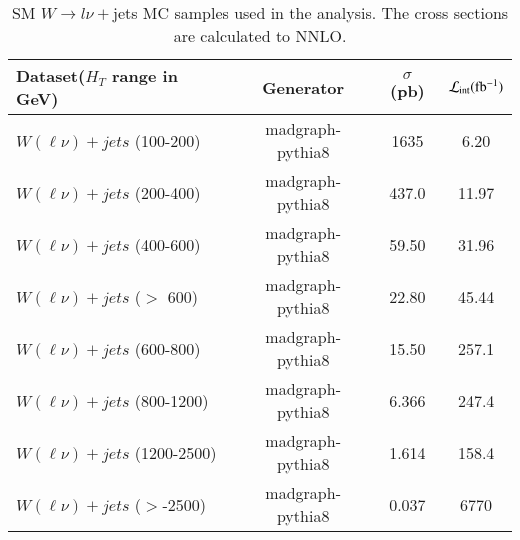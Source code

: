 \begin{table}[h]
\centering
\caption{SM $W\rightarrow l \nu+$jets MC samples used in the analysis. The cross
  sections are calculated to NNLO. }
\label{tab:wjetsMCsamples}
{\footnotesize
\begin{tabular}{lccc}
\hline \hline
Dataset($H_{T}$ range in GeV) & Generator &$\sigma$ (pb) & ${\cal L}_{\rm int}(\rm fb^{-1})$ \\
\hline
$W(\ell\nu)+jets$ (100-200) & madgraph-pythia8 & 1635 & 6.20\\
$W(\ell\nu)+jets$ (200-400) & madgraph-pythia8 & 437.0 & 11.97\\
$W(\ell\nu)+jets$ (400-600) & madgraph-pythia8 & 59.50 & 31.96\\
$W(\ell\nu)+jets$ ($ > $ 600) & madgraph-pythia8 & 22.80 & 45.44\\
$W(\ell\nu)+jets$ (600-800) & madgraph-pythia8 & 15.50 & 257.1\\
$W(\ell\nu)+jets$ (800-1200) & madgraph-pythia8 & 6.366 & 247.4\\
$W(\ell\nu)+jets$ (1200-2500) & madgraph-pythia8 & 1.614 & 158.4\\
$W(\ell\nu)+jets$ ($ > $-2500) & madgraph-pythia8 & 0.037 & 6770\\
\hline \hline
\end{tabular}
}
\end{table}

